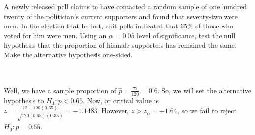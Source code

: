 A newly released poll claims to have contacted a random sample of one hundred twenty of the politician's
current supporters and found that seventy-two were men. In the election that he lost, exit polls
indicated that $65\%$ of those who voted for him were men. Using an $\alpha=0.05$ level of significance,
test the null hypothesis that the proportion of hismale supporters has remained the same. Make the
alternative hypothesis one-sided.\\\\

\begin{solution}\renewcommand{\qedsymbol}{}\ \\
    Well, we have a sample proportion of $\hat{p}=\frac{72}{120}=0.6$. So, we will set the alternative
    hypothesis to $H_1:p<0.65$. Now, or critical value is
    $z=\frac{72-120(0.65)}{\sqrt{120(0.65)(0.35)}}=-1.1483$. However, $z>z_{\alpha}=-1.64$, so we fail
    to reject $H_0:p=0.65$.

\end{solution}